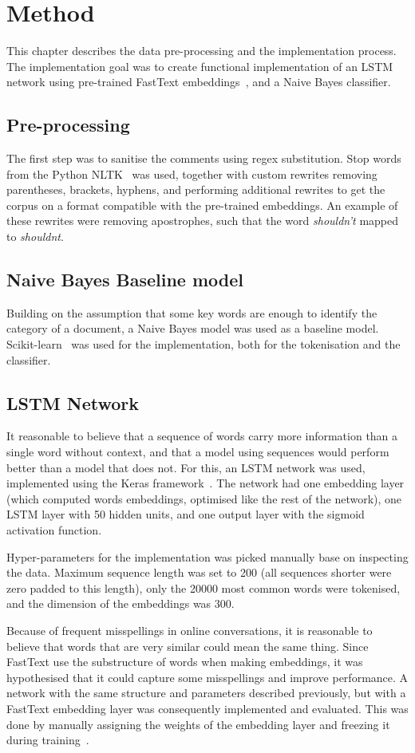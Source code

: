 \chapter{Method}
This chapter describes the data pre-processing and the implementation
process. The implementation goal was to create functional
implementation of an LSTM network using pre-trained FastText
embeddings~\cite{joulin2016bag,joulin2016fasttext}, and a Naive Bayes classifier.

\section{Pre-processing}
The first step was to sanitise the comments using regex
substitution. Stop words from the Python NLTK~\cite{nltk-stopwords}
was used, together with custom rewrites removing parentheses, brackets, hyphens,
and performing additional rewrites to get the corpus on a format
compatible with the pre-trained embeddings. An example of these
rewrites were removing apostrophes, such that the word
\textit{shouldn't} mapped to \textit{shouldnt}.

\section{Naive Bayes Baseline model}
Building on the assumption that some key words are enough to identify the
category of a document, a Naive Bayes model was used as a baseline
model. Scikit-learn~\cite{scikit-learn} was used for the
implementation, both for the tokenisation and the classifier.

\section{LSTM Network}\label{sec:lstm}
It reasonable to believe that a sequence of words carry more
information than a single word without context, and that a model using
sequences would perform better than a model that does not. For this, an LSTM
network was used, implemented using the Keras
framework~\cite{chollet2015keras}. The network had one embedding layer (which computed words embeddings,
optimised like the rest of the network), one LSTM layer with 50 hidden
units, and one output layer with the sigmoid activation function.

Hyper-parameters for the implementation
was picked manually base on inspecting the data. Maximum sequence length was set
to 200 (all sequences shorter were zero padded to this length), only
the 20000 most common words were tokenised, and the dimension of the
embeddings was 300.
 
Because of frequent misspellings in online conversations,
it is reasonable to believe that words that are very similar could
mean the same thing. Since FastText use the substructure of words when
making embeddings, it was hypothesised that it could capture
some misspellings and improve performance. A network with the same
structure and parameters described previously, but with a FastText embedding layer was
consequently implemented and evaluated. This was done by manually
assigning the weights of the embedding layer and freezing it during training~\cite{keras-using-embeddings}.
